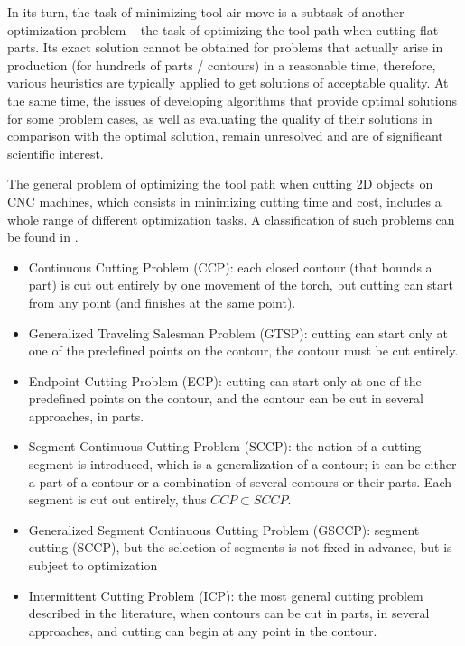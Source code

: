 \documentclass[]{interact}
\theoremstyle{plain}%
\theoremstyle{definition}
\theoremstyle{remark}
\begin{document}
In its turn,
the task of minimizing tool air move
is a subtask of another optimization problem --
the task of optimizing the tool path when cutting flat parts.
Its exact solution cannot be obtained for problems
that actually arise in production
(for hundreds of parts / contours) in a reasonable time,
therefore,
various heuristics are typically applied
to get solutions of acceptable quality.
At the same time, the issues of developing algorithms
that provide optimal solutions for some problem cases,
as well as evaluating the quality of their solutions
in comparison with the optimal solution,
remain unresolved and are of significant scientific interest.

The general problem of optimizing the tool path
when cutting 2D objects on CNC machines,
which consists in minimizing cutting time and cost,
includes a whole range of different optimization tasks.
A classification of such problems
can be found
in \cite{bi01,bi02,bi03}.

\begin{itemize}
  \item
  Continuous Cutting Problem (CCP): each closed contour (that bounds a part)
  is cut out entirely by one movement of the torch,
  but cutting can start from any point (and finishes at the same point).

  \item
  Generalized Traveling Salesman Problem (GTSP):
  cutting can start only at one of the predefined points on the contour,
  the contour must be cut entirely.

  \item
  Endpoint Cutting Problem (ECP):
  cutting can start only at one of the predefined points on the contour,
  and the contour can be cut in several approaches, in parts.

  \item
  Segment Continuous Cutting Problem (SCCP):
  the notion of a cutting segment is introduced,
  which is a generalization of a contour;
  it can be either a part of a contour
  or a combination of several contours or their parts.
  Each segment is cut out entirely, thus
  $ CCP \subset SCCP$.

  \item
  Generalized Segment Continuous Cutting Problem (GSCCP):
  segment cutting (SCCP),
  but the selection of segments is not fixed in advance,
  but is subject to optimization

  \item
  Intermittent Cutting Problem (ICP):
  the most general cutting problem described in the literature,
  when contours can be cut in parts,
  in several approaches,
  and cutting can begin at any point in the contour.
\end{itemize}
\end{document}
